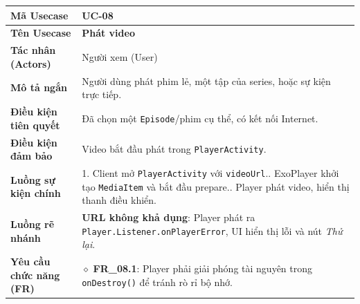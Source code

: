 \begin{table}[H]
\renewcommand{\arraystretch}{1.3}
\centering
\begin{tabularx}{\textwidth}{|p{4.5cm}|X|}
\hline
\cellcolor{gray!15}\bfseries Mã Usecase & \textbf{UC-08} \\ \hline
\cellcolor{gray!15}\bfseries Tên Usecase & \textbf{Phát video} \\ \hline
\cellcolor{gray!15}\bfseries Tác nhân (Actors) & Người xem (User) \\ \hline
\cellcolor{gray!15}\bfseries Mô tả ngắn & Người dùng phát phim lẻ, một tập của series, hoặc sự kiện trực tiếp. \\ \hline
\cellcolor{gray!15}\bfseries Điều kiện tiên quyết & Đã chọn một \texttt{Episode}/phim cụ thể, có kết nối Internet. \\ \hline
\cellcolor{gray!15}\bfseries Điều kiện đảm bảo & Video bắt đầu phát trong \texttt{PlayerActivity}. \\ \hline
\cellcolor{gray!15}\bfseries Luồng sự kiện chính & 1. Client mở \texttt{PlayerActivity} với \texttt{videoUrl}.\newline 2. ExoPlayer khởi tạo \texttt{MediaItem} và bắt đầu prepare.\newline 3. Player phát video, hiển thị thanh điều khiển. \\ \hline
\cellcolor{gray!15}\bfseries Luồng rẽ nhánh & \textbf{URL không khả dụng}: Player phát ra \texttt{Player.Listener.onPlayerError}, UI hiển thị lỗi và nút \textit{Thử lại}. \\ \hline
\cellcolor{gray!15}\bfseries Yêu cầu chức năng (FR) & $\diamond$ \textbf{FR\_08.1}: Player phải giải phóng tài nguyên trong \texttt{onDestroy()} để tránh rò rỉ bộ nhớ. \\ \hline
\end{tabularx}
\end{table}

